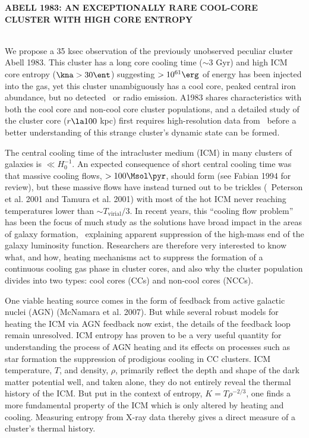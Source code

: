 \documentclass[letterpaper,11pt,twocolumn]{article}
\begin{document}
\pagestyle{plain}

\begin{center}
\bfseries\uppercase{Abell 1983: An Exceptionally Rare Cool-Core
  Cluster with High Core Entropy}
\end{center}

\\
We propose a 35 ksec observation of the previously unobserved peculiar
cluster Abell 1983. This cluster has a long core cooling time ($\sim
3$ Gyr) and high ICM core entropy ($\kna > 30 \ent$) suggesting $>
10^{61} \erg$ of energy has been injected into the gas, yet this
cluster unambiguously has a cool core, peaked central iron abundance,
but no detected \halpha\ or radio emission. A1983 shares
characteristics with both the cool core and non-cool core cluster
populations, and a detailed study of the cluster core ($r \la 100$
kpc) first requires high-resolution data from \chandra\ before a
better understanding of this strange cluster's dynamic state can be
formed.

The central cooling time of the intracluster medium (ICM) in many
clusters of galaxies is $\ll H_0^{-1}$. An expected consequence of
short central cooling time was that massive cooling flows, $> 100
\Msol \pyr$, should form (see Fabian 1994 for review), but these
massive flows have instead turned out to be trickles (\eg\ Peterson et
al. 2001 and Tamura et al. 2001) with most of the hot ICM never
reaching temperatures lower than $\sim T_{\mathrm{virial}}/3$. In
recent years, this ``cooling flow problem'' has been the focus of much
study as the solutions have broad impact in the areas of galaxy
formation, \eg\ explaining apparent suppression of the high-mass end
of the galaxy luminosity function. Researchers are therefore very
interested to know what, and how, heating mechanisms act to suppress
the formation of a continuous cooling gas phase in cluster cores, and
also why the cluster population divides into two types: cool cores
(CCs) and non-cool cores (NCCs).

One viable heating source comes in the form of feedback from active
galactic nuclei (AGN) (McNamara et al. 2007). But while several robust
models for heating the ICM via AGN feedback now exist, the details of
the feedback loop remain unresolved. ICM entropy has proven to be a
very useful quantity for understanding the process of AGN heating and
its effects on processes such as star formation the suppression of
prodigious cooling in CC clusters. ICM temperature, $T$, and density,
$\rho$, primarily reflect the depth and shape of the dark matter
potential well, and taken alone, they do not entirely reveal the
thermal history of the ICM. But put in the context of entropy, $K =
T\rho^{-2/3}$, one finds a more fundamental property of the ICM which
is only altered by heating and cooling. Measuring entropy from X-ray
data thereby gives a direct measure of a cluster's thermal history.
\end{document}
